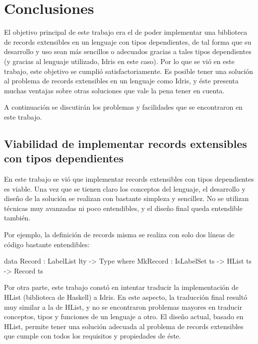 
\chapter{Conclusiones}
\label{ch:5}

El objetivo principal de este trabajo era el de poder implementar una biblioteca de records extensibles en un lenguaje con tipos dependientes, de tal forma que su desarrollo y uso sean más sencillos o adecuados gracias a tales tipos dependientes (y gracias al lenguaje utilizado, Idris en este caso). Por lo que se vió en este trabajo, este objetivo se cumplió satisfactoriamente. Es posible tener una solución al problema de records extensibles en un lenguaje como Idris, y éste presenta muchas ventajas sobre otras soluciones que vale la pena tener en cuenta.

A continuación se discutirán los problemas y facilidades que se encontraron en este trabajo.

\section{Viabilidad de implementar records extensibles con tipos dependientes}

En este trabajo se vió que implementar records extensibles con tipos dependientes es viable. Una vez que se tienen claro los conceptos del lenguaje, el desarrollo y diseño de la solución se realizan con bastante simpleza y sencillez. No se utilizan técnicas muy avanzadas ni poco entendibles, y el diseño final queda entendible también.

Por ejemplo, la definición de records misma se realiza con solo dos líneas de código bastante entendibles:

\begin{code}
data Record : LabelList lty -> Type where
  MkRecord : IsLabelSet ts -> HList ts -> Record ts
\end{code}

Por otra parte, este trabajo constó en intentar traducir la implementación de HList (biblioteca de Haskell) a Idris. En este aspecto, la traducción final resultó muy similar a la de HList, y no se encontraron problemas mayores en traducir conceptos, tipos y funciones de un lenguaje a otro. El diseño actual, basado en HList, permite tener una solución adecuada al problema de records extensibles que cumple con todos los requisitos y propiedades de éste.

